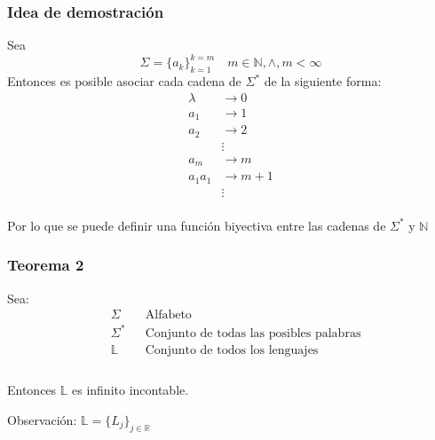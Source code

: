 \subsubsection*{Idea de demostración}

Sea 
\begin{equation*}
    \Sigma = \{a_k\}_{k=1}^{k=m}\quad m \in \mathbb{N},\land,m < \infty
\end{equation*}
Entonces es posible asociar cada cadena de $\Sigma^*$ de la siguiente forma:
\begin{align*}
    \lambda &\rightarrow 0\\
    a_1 & \rightarrow 1\\
    a_2 & \rightarrow 2\\
    &\vdots\\
    a_m &\rightarrow m\\
    a_1 a_1 &\rightarrow m + 1\\
    & \vdots \\
\end{align*}

Por lo que se puede definir una función biyectiva entre las cadenas de $\Sigma^*$ y $\mathbb{N}$

\subsubsection{Teorema 2}

Sea:
\begin{align*}
    &\Sigma &&\text{Alfabeto}\\
    &\Sigma^* &&\text{Conjunto de todas las posibles palabras}\\
    &\mathbb{L} &&\text{Conjunto de todos los lenguajes}\\
\end{align*}\\
Entonces $\mathbb{L}$ es infinito incontable.

Observación: $\mathbb{L} = \{L_j\}_{j \in \mathbb{R}}$

